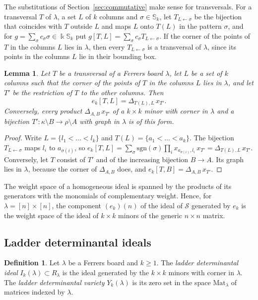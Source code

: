 \documentclass[11pt]{amsart}
\newtheorem{lemma}[theorem]{Lemma}
\theoremstyle{definition}
\newtheorem{definition}[theorem]{Definition}
\theoremstyle{remark}
\newcommand{\bS}{\mathbb{S}}
\newcommand{\kk}{\Bbbk}
\newcommand{\sgn}{\mathrm{sgn}}
\newcommand{\cS}{\mathscr{S}}
\newcommand{\Mat}{\mathrm{Mat}}
\begin{document}
The substitutions of Section~\ref{sec:commutative} make sense for transversals. For a transversal $T$ of $\lambda$, a set $L$ of $k$ columns and $\sigma\in\bS_k$, let $T_{L\leftarrow\sigma}$ be the bijection that coincides with $T$ outside $L$ and maps $L$ onto $T(L)$ in the pattern $\sigma$, and for $g=\sum_\sigma c_\sigma\sigma\in\kk\bS_k$ put $g[T,L]=\sum_\sigma c_\sigma T_{L\leftarrow\sigma}$. If the corner of the points of $T$ in the columns $L$ lies in $\lambda$, then every $T_{L\leftarrow\sigma}$ is a transversal of $\lambda$, since its points in the columns $L$ lie in their bounding box.

\begin{lemma}\label{lem:minors}
Let $T$ be a transversal of a Ferrers board $\lambda$, let $L$ be a set of $k$ columns such that the corner of the points of $T$ in the columns $L$ lies in $\lambda$, and let $T'$ be the restriction of $T$ to the other columns. Then
\[
e_k[T,L]=\Delta_{T(L),L}\,x_{T'} .
\]
Conversely, every product $\Delta_{A,B}\,x_{T'}$ of a $k\times k$ minor with corner in $\lambda$ and a bijection $T'\colon\kappa\setminus B\to\rho\setminus A$ with graph in $\lambda$ is of this form.
\end{lemma}

\begin{proof}
Write $L=\{l_1<\dots<l_k\}$ and $T(L)=\{a_1<\dots<a_k\}$. The bijection $T_{L\leftarrow\sigma}$ maps $l_i$ to $a_{\sigma(i)}$, so $e_k[T,L]=\sum_\sigma\sgn(\sigma)\prod_ix_{a_{\sigma(i)},l_i}\,x_{T'}=\Delta_{T(L),L}\,x_{T'}$. Conversely, let $T$ consist of $T'$ and of the increasing bijection $B\to A$. Its graph lies in $\lambda$, because the corner of $\Delta_{A,B}$ does, and $e_k[T,B]=\Delta_{A,B}\,x_{T'}$.
\end{proof}

The weight space of a homogeneous ideal is spanned by the products of its generators with the monomials of complementary weight. Hence, for $\lambda=[n]\times[n]$, the component $(e_k)(n)$ of the ideal of $\cS$ generated by $e_k$ is the weight space of the ideal of $k\times k$ minors of the generic $n\times n$ matrix.

\subsection{Ladder determinantal ideals}\label{sec:ladder}

\begin{definition}\label{def:ladder}
Let $\lambda$ be a Ferrers board and $k\ge1$. The \emph{ladder determinantal ideal} $I_k(\lambda)\subset R_\lambda$ is the ideal generated by the $k\times k$ minors with corner in $\lambda$. The \emph{ladder determinantal variety} $Y_k(\lambda)$ is its zero set in the space $\Mat_\lambda$ of matrices indexed by $\lambda$.
\end{definition}
\end{document}
